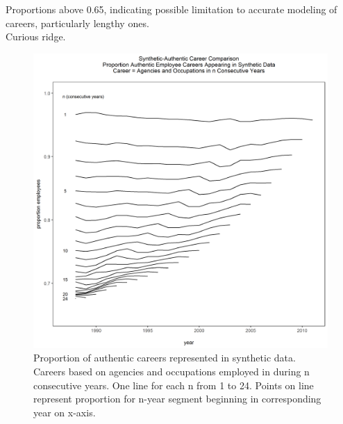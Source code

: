 \documentclass[10pt, letterpaper]{article}
\begin{document}
\begin{spacing}{1.0}
Proportions above 0.65, indicating possible limitation to accurate modeling of careers, particularly lengthy ones.\\

Curious ridge.\\

\begin{figure}[h]
    \centering
    \includegraphics[width=5.25in, trim={0 0 0 0.75in}, clip]{CareerProportionsAgencyOcc.png}
    \caption{Proportion of authentic careers represented in synthetic data.  Careers based on agencies and occupations employed in during n consecutive years.  One line for each n from 1 to 24.  Points on line represent proportion for n-year segment beginning in corresponding year on x-axis.}
    \label{figure:CareerProportionsAgencyOcc}
\end{figure}

\clearpage

\end{spacing}

\newpage

\begingroup
\begin{spacing}{1.0}
    \raggedright
    
\end{spacing}
\endgroup
\end{document}
